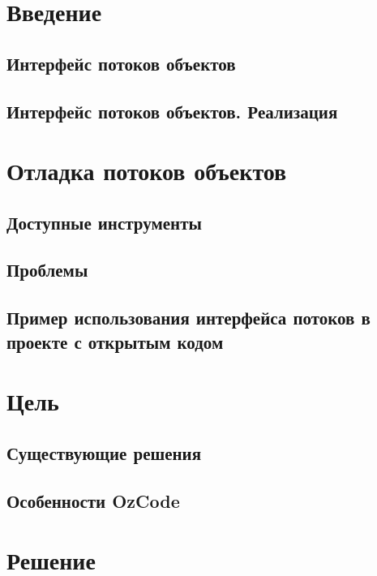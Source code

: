 

\section{Введение}

\subsection{Интерфейс потоков объектов}

\subsection{Интерфейс потоков объектов. Реализация}





\section{Отладка потоков объектов}
\subsection{Доступные инструменты}

\subsection{Проблемы}

\subsection{Пример использования интерфейса потоков в проекте с открытым кодом}


\section{Цель}

\subsection{Существующие решения}

\subsection{Особенности OzCode}


\section{Решение}
